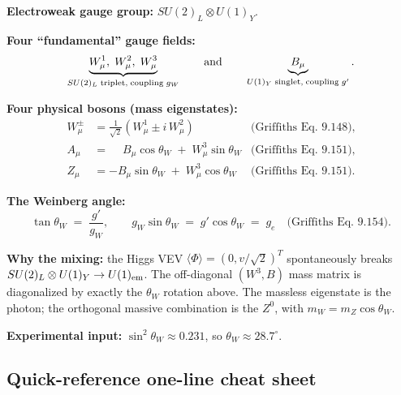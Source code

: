 \documentclass[11pt]{article}
\begin{document}
\begin{resultbox}
\textbf{Electroweak gauge group:} $SU(2)_L \otimes U(1)_Y$.

\textbf{Four ``fundamental'' gauge fields:}
\[
\underbrace{W^1_\mu,\; W^2_\mu,\; W^3_\mu}_{SU(2)_L\;\text{triplet,\;coupling}\;g_W}
\qquad\text{and}\qquad
\underbrace{B_\mu}_{U(1)_Y\;\text{singlet,\;coupling}\;g'}.
\]

\textbf{Four physical bosons (mass eigenstates):}
\[
\boxed{\;\;
\begin{aligned}
W^{\pm}_\mu &= \tfrac{1}{\sqrt{2}}\!\left( W^1_\mu \pm i\, W^2_\mu \right)
              & \text{(Griffiths Eq.~9.148)}, \\[3pt]
A_\mu       &= \phantom{-}B_\mu \cos\theta_W \;+\; W^3_\mu \sin\theta_W
              & \text{(Griffiths Eq.~9.151)}, \\[3pt]
Z_\mu       &= -B_\mu \sin\theta_W \;+\; W^3_\mu \cos\theta_W
              & \text{(Griffiths Eq.~9.151)}.
\end{aligned}
\;\;}
\]

\textbf{The Weinberg angle:}
\[
\tan\theta_W \;=\; \frac{g'}{g_W},
\qquad
g_W \sin\theta_W \;=\; g' \cos\theta_W \;=\; g_e
\quad\text{(Griffiths Eq.~9.154).}
\]

\textbf{Why the mixing:} the Higgs VEV $\langle\Phi\rangle = (0, v/\sqrt{2})^T$
spontaneously breaks $SU(2)_L \otimes U(1)_Y \to U(1)_{\rm em}$. The off-diagonal
$(W^3, B)$ mass matrix is diagonalized by exactly the $\theta_W$ rotation above. The
massless eigenstate is the photon; the orthogonal massive combination is the $Z^0$, with
$m_W = m_Z \cos\theta_W$.

\textbf{Experimental input:} $\sin^2\theta_W \approx 0.231$, so $\theta_W \approx 28.7^\circ$.
\end{resultbox}

\subsection*{Quick-reference one-line cheat sheet}

\noindent{}
\end{document}
